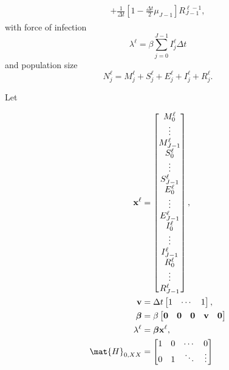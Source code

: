 \documentclass{jpmarticle}
\renewcommand{\vec}[1]{\boldsymbol{\mathrm{#1}}}
\let\subequationsorig\subequations%
\let\endsubequationsorig\endsubequations%
\renewenvironment{subequations}{
  \subequationsorig
  \renewcommand{\theequation}{\theparentequation.\arabic{equation}}
}{
  \endsubequationsorig
}
\begin{document}
\begin{subequations}
\begin{align}
\begin{split}
      + \frac{1}{\Delta t} \left[
        1 - \frac{\Delta t}{2} \mu_{J - 1}
      \right] R_{J - 1}^{\ell - 1},
    \end{split}
  \end{align}
  with force of infection
  \begin{equation}
    \lambda^{\ell} =
    \beta \sum_{j = 0}^{J - 1} I_j^{\ell} \Delta t
  \end{equation}
  and population size
  \begin{equation}
    N_j^{\ell} =
    M_j^{\ell} + S_j^{\ell} + E_j^{\ell} + I_j^{\ell} + R_j^{\ell}.
  \end{equation}
\end{subequations}

Let
\begin{subequations}
  \begin{align}
    \vec{x}^{\ell} &=
    \begin{bmatrix}
      M_0^{\ell} \\ \vdots \\ M_{J - 1}^{\ell} \\
      S_0^{\ell} \\ \vdots \\ S_{J - 1}^{\ell} \\
      E_0^{\ell} \\ \vdots \\ E_{J - 1}^{\ell} \\
      I_0^{\ell} \\ \vdots \\ I_{J - 1}^{\ell} \\
      R_0^{\ell} \\ \vdots \\ R_{J - 1}^{\ell}
    \end{bmatrix},
    \\
    \vec{v} &=
    \Delta t
    \begin{bmatrix}
      1 & \cdots & 1
    \end{bmatrix},
    \\
    \vec{\beta} &=
    \beta
    \begin{bmatrix}
      \vec{0} & \vec{0} & \vec{0} & \vec{v} & \vec{0}
    \end{bmatrix}
    \\
    \lambda^{\ell} &=
    \vec{\beta} \vec{x}^{\ell},
    \\
    \mat{H}_{0, XX} &=
    \begin{bmatrix}
      1 & 0 & \cdots & 0 \\
      0 & 1 & \ddots & \vdots \\

\end{bmatrix}
\end{align}
\end{subequations}
\end{document}

